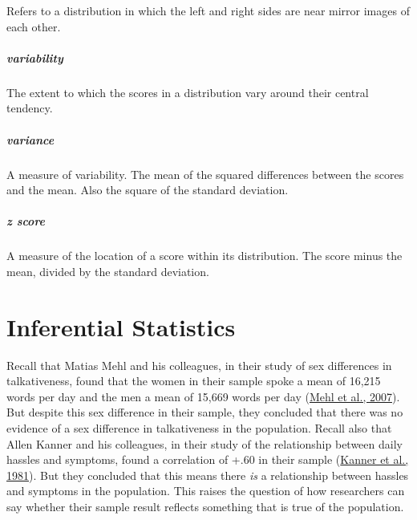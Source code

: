 \documentclass[
]{krantz}
\begin{document}
Refers to a distribution in which the left and right sides are near mirror images of each other.

\hypertarget{variability}{%
\paragraph*{variability}\label{variability}}

The extent to which the scores in a distribution vary around their central tendency.

\hypertarget{variance}{%
\paragraph*{variance}\label{variance}}

A measure of variability. The mean of the squared differences between the scores and the mean. Also the square of the standard deviation.

\hypertarget{z-score}{%
\paragraph*{\texorpdfstring{\emph{z} score}{z score}}\label{z-score}}

A measure of the location of a score within its distribution. The score minus the mean, divided by the standard deviation.

\hypertarget{inferential-statistics}{%
\chapter{Inferential Statistics}\label{inferential-statistics}}

Recall that Matias Mehl and his colleagues, in their study of sex differences in talkativeness, found that the women in their sample spoke a mean of 16,215 words per day and the men a mean of 15,669 words per day (\protect\hyperlink{ref-mehl2007women}{Mehl et al., 2007}). But despite this sex difference in their sample, they concluded that there was no evidence of a sex difference in talkativeness in the population. Recall also that Allen Kanner and his colleagues, in their study of the relationship between daily hassles and symptoms, found a correlation of +.60 in their sample (\protect\hyperlink{ref-kanner1981comparison}{Kanner et al., 1981}). But they concluded that this means there \emph{is} a relationship between hassles and symptoms in the population. This raises the question of how researchers can say whether their sample result reflects something that is true of the population.
\end{document}
